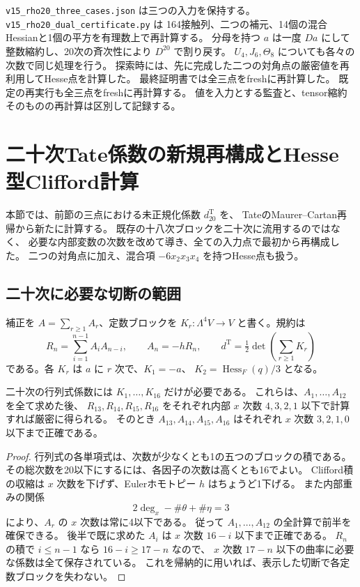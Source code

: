 \texttt{v15\_rho20\_three\_cases.json} は三つの入力を保持する。
\nolinkurl{v15_rho20_dual_certificate.py} は
164接触列、二つの補元、14個の混合Hessianと1個の平方を有理数上で再計算する。
分母を持つ $a$ は一度 $Da$ にして整数縮約し、20次の斉次性により $D^{20}$ で割り戻す。
$U_4,J_6,\Theta_8$ についても各々の次数で同じ処理を行う。
探索時には、先に完成した二つの対角点の厳密値を再利用してHesse点を計算した。
最終証明書では全三点をfreshに再計算した。
既定の再実行も全三点をfreshに再計算する。
値を入力とする監査と、tensor縮約そのものの再計算は区別して記録する。



\section{二十次Tate係数の新規再構成とHesse型Clifford計算}
\label{sec:v15-tate-twentieth}

本節では、前節の三点における未正規化係数 $d_{20}^{\mathrm T}$ を、
TateのMaurer--Cartan再帰から新たに計算する。
既存の十八次ブロックを二十次に流用するのではなく、
必要な内部変数の次数を改めて導き、全ての入力点で最初から再構成した。
二つの対角点に加え、混合項 $-6x_2x_3x_4$ を持つHesse点も扱う。

\subsection{二十次に必要な切断の範囲}

補正を $A=\sum_{r\ge1}A_r$、定数ブロックを
$K_r:\Lambda^4V\to V$ と書く。規約は
\[
 R_n=\sum_{i=1}^{n-1}A_iA_{n-i},\qquad A_n=-hR_n,
 \qquad d^{\mathrm T}=\tfrac12\det\!\left(\sum_{r\ge1}K_r\right)
\]
である。各 $K_r$ は $a$ に $r$ 次で、$K_1=-a$、
$K_2=\operatorname{Hess}_F(q)/3$ となる。

\begin{lemma}[二十次の厳密な内部次数切断]
\label{lem:v15-tate-twentieth-truncation}
二十次の行列式係数には $K_1,\ldots,K_{16}$ だけが必要である。
これらは、$A_1,\ldots,A_{12}$ を全て求めた後、
$R_{13},R_{14},R_{15},R_{16}$ をそれぞれ内部 $x$ 次数
$4,3,2,1$ 以下で計算すれば厳密に得られる。
そのとき $A_{13},A_{14},A_{15},A_{16}$ はそれぞれ
$x$ 次数 $3,2,1,0$ 以下まで正確である。
\end{lemma}

\begin{proof}
行列式の各単項式は、次数が少なくとも1の五つのブロックの積である。
その総次数を20以下にするには、各因子の次数は高くとも16でよい。
Clifford積の収縮は $x$ 次数を下げず、Eulerホモトピー $h$ はちょうど1下げる。
また内部重みの関係
\[
 2\deg_x-\#\theta+\#\eta=3
\]
により、$A_r$ の $x$ 次数は常に4以下である。
従って $A_1,\ldots,A_{12}$ の全計算で前半を確保できる。
後半で既に求めた $A_i$ は $x$ 次数 $16-i$ 以下まで正確である。
$R_n$ の積で $i\le n-1$ なら $16-i\ge17-n$ なので、
$x$ 次数 $17-n$ 以下の曲率に必要な係数は全て保存されている。
これを帰納的に用いれば、表示した切断で各定数ブロックを失わない。
\end{proof}

